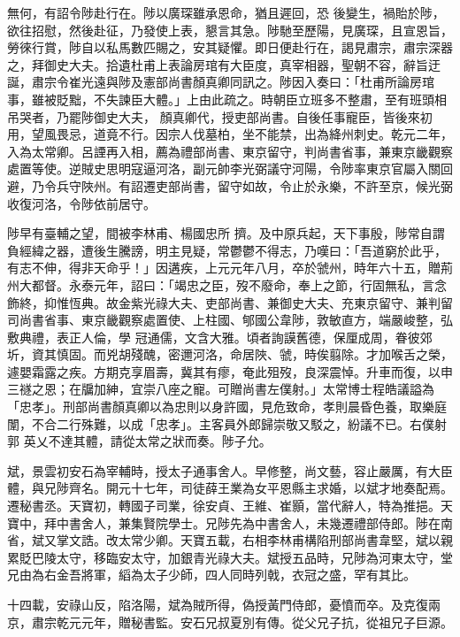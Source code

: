 \begin{pinyinscope}
 無何，有詔令陟赴行在。陟以廣琛雖承恩命，猶且遲回，恐
 後變生，禍貽於陟，欲往招慰，然後赴征，乃發使上表，懇言其急。陟馳至歷陽，見廣琛，且宣恩旨，勞徠行賞，陟自以私馬數匹賜之，安其疑懼。即日便赴行在，謁見肅宗，肅宗深器之，拜御史大夫。拾遺杜甫上表論房琯有大臣度，真宰相器，聖朝不容，辭旨迂誕，肅宗令崔光遠與陟及憲部尚書顏真卿同訊之。陟因入奏曰：「杜甫所論房琯事，雖被貶黜，不失諫臣大體。」上由此疏之。時朝臣立班多不整肅，至有班頭相吊哭者，乃罷陟御史大夫，
 顏真卿代，授吏部尚書。自後任事寵臣，皆後來初用，望風畏忌，道竟不行。因宗人伐墓柏，坐不能禁，出為絳州刺史。乾元二年，入為太常卿。呂諲再入相，薦為禮部尚書、東京留守，判尚書省事，兼東京畿觀察處置等使。逆賊史思明寇逼河洛，副元帥李光弼議守河陽，令陟率東京官屬入關回避，乃令兵守陜州。有詔遷吏部尚書，留守如故，令止於永樂，不許至京，候光弼收復河洛，令陟依前居守。



 陟早有臺輔之望，間被李林甫、楊國忠所
 擠。及中原兵起，天下事殷，陟常自謂負經緯之器，遭後生騰謗，明主見疑，常鬱鬱不得志，乃嘆曰：「吾道窮於此乎，有志不伸，得非天命乎！」因遘疾，上元元年八月，卒於虢州，時年六十五，贈荊州大都督。永泰元年，詔曰：「竭忠之臣，歿不廢命，奉上之節，行固無私，言念飾終，抑惟恆典。故金紫光祿大夫、吏部尚書、兼御史大夫、充東京留守、兼判留司尚書省事、東京畿觀察處置使、上柱國、郇國公韋陟，敦敏直方，端嚴峻整，弘敷典禮，表正人倫，學
 冠通儒，文含大雅。頃者詢謨舊德，保厘成周，眷彼郊圻，資其慎固。而兇胡殘醜，密邇河洛，命居陜、虢，時俟翦除。才加喉舌之榮，遽嬰霜露之疾。方期克享眉壽，冀其有瘳，奄此殂歿，良深震悼。升車而復，以申三禭之恩；在牖加紳，宜崇八座之寵。可贈尚書左僕射。」太常博士程皓議謚為「忠孝」。刑部尚書顏真卿以為忠則以身許國，見危致命，孝則晨昏色養，取樂庭闈，不合二行殊難，以成「忠孝」。主客員外郎歸崇敬又駁之，紛議不已。右僕射郭
 英乂不達其體，請從太常之狀而奏。陟子允。



 斌，景雲初安石為宰輔時，授太子通事舍人。早修整，尚文藝，容止嚴厲，有大臣體，與兄陟齊名。開元十七年，司徒薛王業為女平恩縣主求婚，以斌才地奏配焉。遷秘書丞。天寶初，轉國子司業，徐安貞、王維、崔顥，當代辭人，特為推挹。天寶中，拜中書舍人，兼集賢院學士。兄陟先為中書舍人，未幾遷禮部侍郎。陟在南省，斌又掌文誥。改太常少卿。天寶五載，右相李林甫構陷刑部尚書韋堅，斌以親
 累貶巴陵太守，移臨安太守，加銀青光祿大夫。斌授五品時，兄陟為河東太守，堂兄由為右金吾將軍，縚為太子少師，四人同時列戟，衣冠之盛，罕有其比。



 十四載，安祿山反，陷洛陽，斌為賊所得，偽授黃門侍郎，憂憤而卒。及克復兩京，肅宗乾元元年，贈秘書監。安石兄叔夏別有傳。從父兄子抗，從祖兄子巨源。




\end{pinyinscope}
